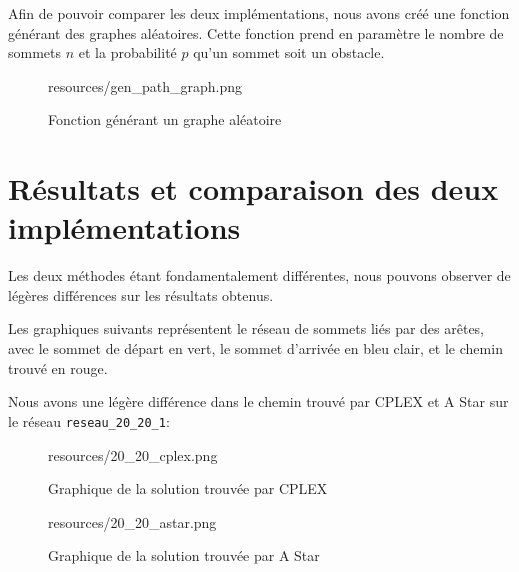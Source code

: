 Afin de pouvoir comparer les deux implémentations, nous avons créé une fonction générant des graphes aléatoires. Cette fonction prend en paramètre le nombre de sommets $n$ et la probabilité $p$ qu'un sommet soit un obstacle.

\begin{figure}[H]
    \centering
    \begin{includegraphics}[width=1\textwidth]{resources/gen_path_graph.png}
    \end{includegraphics}
    \caption{Fonction générant un graphe aléatoire}
    \label{fig:gen_path_graph}
\end{figure}

\section{Résultats et comparaison des deux implémentations}
\label{sec:shortest_path_comparison}

Les deux méthodes étant fondamentalement différentes, nous pouvons observer de légères différences sur les résultats obtenus.

Les graphiques suivants représentent le réseau de sommets liés par des arêtes, avec le sommet de départ en vert, le sommet d'arrivée en bleu clair, et le chemin trouvé en rouge.

Nous avons une légère différence dans le chemin trouvé par CPLEX et A Star sur le réseau \texttt{reseau\_20\_20\_1}:

\begin{figure}[H]
    \centering
    \begin{includegraphics}[width=.6\textwidth]{resources/20_20_cplex.png}
    \end{includegraphics}
    \caption{Graphique de la solution trouvée par CPLEX}
    \label{fig:cplex_2020}
\end{figure}

\begin{figure}[H]
    \centering
    \begin{includegraphics}[width=.6\textwidth]{resources/20_20_astar.png}
    \end{includegraphics}
    \caption{Graphique de la solution trouvée par A Star}
    \label{fig:astar_2020}
\end{figure}

